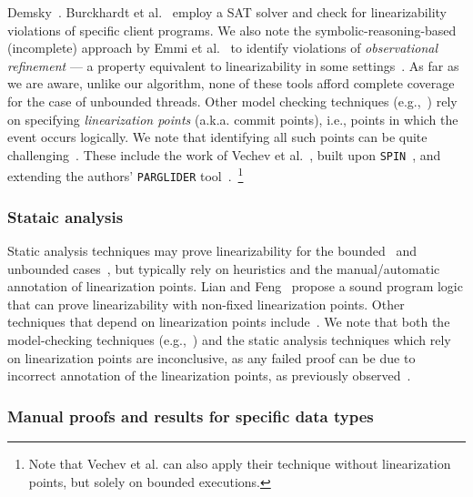 Demsky~\cite{OuDe17}. 
%
Burckhardt et al.~\cite{BuAlMa07} employ a SAT solver and check for 
linearizability violations of specific client programs.
%
We also note the symbolic-reasoning-based (incomplete) approach by Emmi et 
al.~\cite{EmEnHa15} to identify violations of \textit{observational refinement} 
--- a property equivalent to linearizability in some settings~\cite{FiOhRiYa10, 
	BoEmCoHa15}.
%
As far as we are aware, unlike our algorithm, none of these tools afford 
complete coverage for the case of unbounded threads.
%
Other model checking techniques (e.g.,~\cite{Fl04}) rely on specifying 
\textit{linearization points} (a.k.a. commit points), i.e., points in which the 
event occurs logically. We note 
that identifying all such points can be quite challenging~\cite{VeYaYo09}.
%
These include the work of Vechev et al.~\cite{VeYaYo09}, built upon 
\texttt{SPIN}~\cite{Ho97}, and extending the authors' \texttt{PARGLIDER} 
tool~\cite{VeYa08}.~\footnote{Note that Vechev et al. can also apply their 
technique without linearization points, but solely on bounded executions.}



\subsubsection{Stataic analysis}

Static analysis techniques may prove linearizability for the 
bounded~\cite{AmRiReSaYa07, BeLeMaRaSa08, MaLeSaRaBe08} and unbounded 
cases~\cite{BeLeMaRaSa08, Va09, 
	Va10}, but typically rely on heuristics and the manual/automatic annotation 
	of 
linearization points. 
%
Lian and Feng~\cite{LiFe13} propose a sound program logic that can prove 
linearizability with non-fixed linearization points.
%
Other techniques that depend on linearization points 
include~\cite{OhRiVeYaYo10, ZhPeHa15, AbJoTr16}. 
%
%
We note that both the model-checking techniques (e.g.,~\cite{CeRaZuChAl10}) and 
the static analysis techniques which rely on linearization points are 
inconclusive, as any failed proof can be due to incorrect annotation of the 
linearization points, as previously observed~\cite{BoEmCoHa15}.
%


\subsubsection{Manual proofs and results for specific data types}

